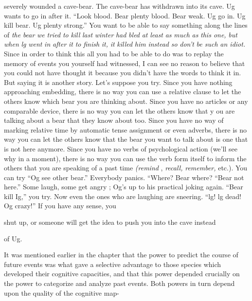 severely wounded a cave-bear. The cave-bear has withdrawn into its cave. Ug wants to go in after it. ``Look blood. Bear plenty blood. Bear weak. Ug go in. Ug kill bear. Ug plenty strong.'' You want to be able to say something along the lines of \textit{the} \textit{bear} \textit{we} \textit{tried} \textit{to} \textit{kill} \textit{last} \textit{winter} \textit{had} \textit{bled} \textit{at} \textit{least} \textit{as} \textit{much} \textit{as} \textit{this one,} \textit{but} \textit{when} \textit{l}\textit{g} \textit{went} \textit{in} \textit{after} \textit{it} \textit{to} \textit{finish} \textit{it,} \textit{it} \textit{killed} \textit{him} \textit{instead} \textit{so} \textit{don't} \textit{be such} \textit{an idiot.} Since in order to think this all you had to be able to do was to replay the memory of events you yourself had witnessed, I can see no reason to believe that you could not have thought it because you didn't have the words to think it in. But saying it is another story. Let's suppose you try. Since you have nothing approaching embedding, there is no way you can use a relative clause to let the others know which bear you are thinking about. Since you have no articles or any comparable device, there is no way you can let the others know that y ou are talking about a bear that they know about too. Since you have no way of marking relative time by automatic tense assignment or even adverbs, there is no way you can let the others know that the bear you want to talk about is one that is not here anymore. Since you have no verbs of psychological action (we'll see why in a moment), there is no way you can use the verb form itself to inform the others that you are speaking of a past time \textit{(remind} , \textit{recall,} \textit{remember,} etc.). You can try ``Og see other bear.'' Everybody panics. ``Where? Bear where?{\textquotedbl} ``Bear not here.'' Some laugh, some get angry ; Og's up to his practical joking again. ``Bear kill Ig,'' you try. Now even the ones who are laughing are sneering. ``lg! lg dead! Og crazy!'' If you have any sense, you

shut up, or someone will get the idea to push you into the cave instead

of Ug.

It was mentioned earlier in the chapter that the power to predict the course of future events was what gave a selective advantage to those species which developed their cognitive capacities, and that this power depended crucially on the power to categorize and analyze past events. Both powers in turn depend upon the quality of the cognitive map-

